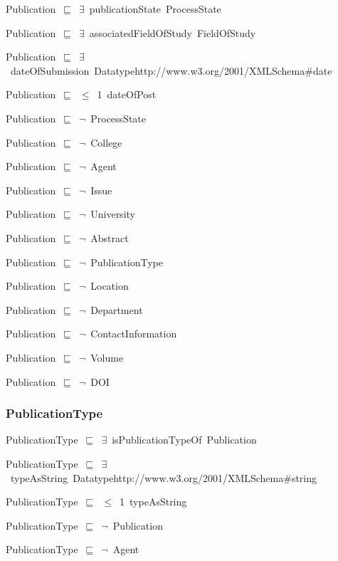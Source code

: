 \documentclass{article}
\begin{document}
Publication~\ensuremath{\sqsubseteq}~\ensuremath{\exists}~publicationState~ProcessState~

Publication~\ensuremath{\sqsubseteq}~\ensuremath{\exists}~associatedFieldOfStudy~FieldOfStudy~

Publication~\ensuremath{\sqsubseteq}~\ensuremath{\exists}~dateOfSubmission~Datatypehttp://www.w3.org/2001/XMLSchema#date~

Publication~\ensuremath{\sqsubseteq}~\ensuremath{\leq}~1~dateOfPost~

Publication~\ensuremath{\sqsubseteq}~\ensuremath{\lnot}~ProcessState

Publication~\ensuremath{\sqsubseteq}~\ensuremath{\lnot}~College

Publication~\ensuremath{\sqsubseteq}~\ensuremath{\lnot}~Agent

Publication~\ensuremath{\sqsubseteq}~\ensuremath{\lnot}~Issue

Publication~\ensuremath{\sqsubseteq}~\ensuremath{\lnot}~University

Publication~\ensuremath{\sqsubseteq}~\ensuremath{\lnot}~Abstract

Publication~\ensuremath{\sqsubseteq}~\ensuremath{\lnot}~PublicationType

Publication~\ensuremath{\sqsubseteq}~\ensuremath{\lnot}~Location

Publication~\ensuremath{\sqsubseteq}~\ensuremath{\lnot}~Department

Publication~\ensuremath{\sqsubseteq}~\ensuremath{\lnot}~ContactInformation

Publication~\ensuremath{\sqsubseteq}~\ensuremath{\lnot}~Volume

Publication~\ensuremath{\sqsubseteq}~\ensuremath{\lnot}~DOI

\subsubsection*{PublicationType}

PublicationType~\ensuremath{\sqsubseteq}~\ensuremath{\exists}~isPublicationTypeOf~Publication~

PublicationType~\ensuremath{\sqsubseteq}~\ensuremath{\exists}~typeAsString~Datatypehttp://www.w3.org/2001/XMLSchema#string~

PublicationType~\ensuremath{\sqsubseteq}~\ensuremath{\leq}~1~typeAsString~

PublicationType~\ensuremath{\sqsubseteq}~\ensuremath{\lnot}~Publication

PublicationType~\ensuremath{\sqsubseteq}~\ensuremath{\lnot}~Agent
\end{document}
